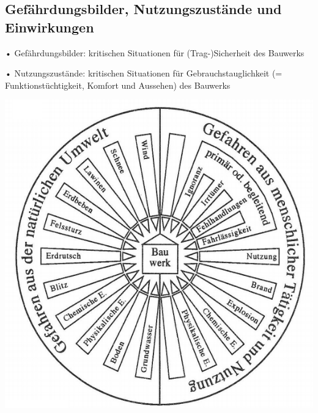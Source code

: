 \begin{multicols}{2}
	
	\section{Gefährdungsbilder, Nutzungszustände und Einwirkungen}
	
		• Gefährdungsbilder: kritischen
		Situationen für (Trag-)Sicherheit des
		Bauwerks
		
		• Nutzungszustände: kritischen
		Situationen für Gebrauchstauglichkeit
		(= Funktionstüchtigkeit, Komfort und
		Aussehen) des Bauwerks
		
		\includegraphics[width=\linewidth]{images/1Gefahren.PNG}
	
\end{multicols}